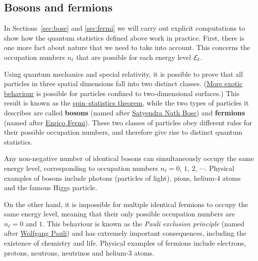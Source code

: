 \subsection{\label{sec:spin}Bosons and fermions}
In Sections~\ref{sec:bose} and \ref{sec:fermi} we will carry out explicit computations to show how the quantum statistics defined above work in practice.
First, there is one more fact about nature that we need to take into account.
This concerns the occupation numbers $n_{\ell}$ that are possible for each energy level $\mathcal E_{\ell}$.

Using quantum mechanics and special relativity, it is possible to prove that all particles in three spatial dimensions fall into two distinct classes.
(\href{https://en.wikipedia.org/wiki/Anyon}{More exotic behaviour} is possible for particles confined to two-dimensional surfaces.)
This result is known as the \href{https://en.wikipedia.org/wiki/Spin-statistics_theorem}{spin--statistics theorem}, while the two types of particles it describes are called \textbf{bosons} (named after \href{https://en.wikipedia.org/wiki/Satyendra_Nath_Bose}{Satyendra Nath Bose}) and \textbf{fermions} (named after \href{https://en.wikipedia.org/wiki/Enrico_Fermi}{Enrico Fermi}).
These two classes of particles obey different rules for their possible occupation numbers, and therefore give rise to distinct quantum statistics.

Any non-negative number of identical bosons can simultaneously occupy the same energy level, corresponding to occupation numbers $n_{\ell} = 0$, $1$, $2$, $\cdots$.
Physical examples of bosons include photons (particles of light), pions, helium-$4$ atoms and the famous Higgs particle.

On the other hand, it is impossible for multiple identical fermions to occupy the same energy level, meaning that their only possible occupation numbers are $n_{\ell} = 0$ and $1$.
This behaviour is known as the \textit{Pauli exclusion principle} (named after \href{https://en.wikipedia.org/wiki/Wolfgang_Pauli}{Wolfgang Pauli}) and has extremely important consequences, including the existence of chemistry and life.
Physical examples of fermions include electrons, protons, neutrons, neutrinos and helium-$3$ atoms.

